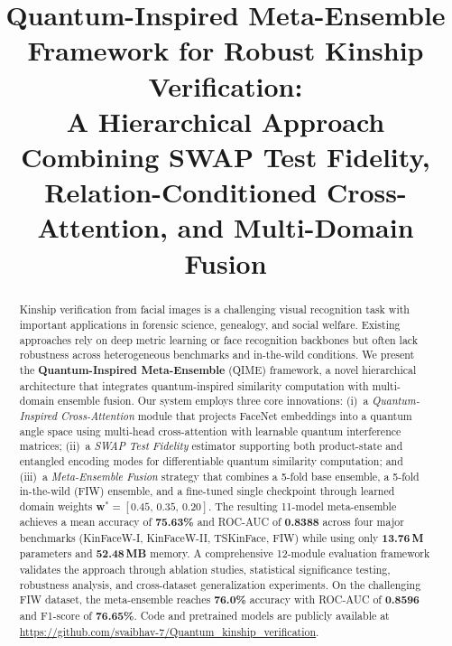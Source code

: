 \documentclass[journal,12pt]{IEEEtran}
\begin{document}
\title{Quantum-Inspired Meta-Ensemble Framework for Robust Kinship Verification:\\
       A Hierarchical Approach Combining SWAP Test Fidelity, Relation-Conditioned Cross-Attention, and Multi-Domain Fusion}

\author{
}

\maketitle

\begin{abstract}
Kinship verification from facial images is a challenging visual recognition
task with important applications in forensic science, genealogy, and social
welfare. Existing approaches rely on deep metric learning or face recognition
backbones but often lack robustness across heterogeneous benchmarks and
in-the-wild conditions. We present the \textbf{Quantum-Inspired Meta-Ensemble}
(QIME) framework, a novel hierarchical architecture that integrates
quantum-inspired similarity computation with multi-domain ensemble fusion.
Our system employs three core innovations: (i)~a \emph{Quantum-Inspired
Cross-Attention} module that projects FaceNet embeddings into a quantum
angle space using multi-head cross-attention with learnable quantum
interference matrices; (ii)~a \emph{SWAP Test Fidelity} estimator supporting
both product-state and entangled encoding modes for differentiable quantum
similarity computation; and (iii)~a \emph{Meta-Ensemble Fusion} strategy
that combines a 5-fold base ensemble, a 5-fold in-the-wild (FIW) ensemble,
and a fine-tuned single checkpoint through learned domain weights
$\mathbf{w}^{*} = [0.45,\, 0.35,\, 0.20]$.
The resulting 11-model meta-ensemble achieves a mean accuracy of
\textbf{75.63\%} and ROC-AUC of \textbf{0.8388} across four major
benchmarks (KinFaceW-I, KinFaceW-II, TSKinFace, FIW) while using only
\textbf{13.76\,M} parameters and \textbf{52.48\,MB} memory. A comprehensive
12-module evaluation framework validates the approach through ablation studies,
statistical significance testing, robustness analysis, and cross-dataset
generalization experiments. On the challenging FIW dataset, the meta-ensemble
reaches \textbf{76.0\%} accuracy with ROC-AUC of \textbf{0.8596} and
F1-score of \textbf{76.65\%}. Code and pretrained models are publicly
available at \url{https://github.com/svaibhav-7/Quantum_kinship_verification}.
\end{abstract}
\end{document}
